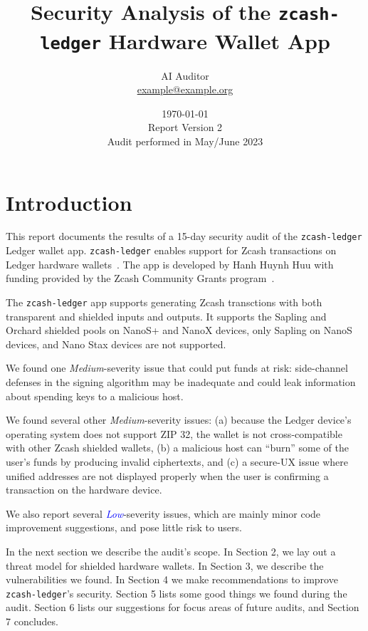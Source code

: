 \documentclass[10pt,titlepage]{article}
\title{Security Analysis of the \texttt{zcash-ledger} Hardware Wallet App}
\author{
    AI Auditor \\
        \href{mailto:example@example.org}{example@example.org}\\
}
\date{\today\\ Report Version 2\\ Audit performed in May/June 2023}
\newcommand{\MediumIssue}{\textcolor{darkyellow}{\emph{Medium}}}
\newcommand{\LowIssue}{\textcolor{blue}{\emph{Low}}}
\begin{document}
\maketitle
{\small\tableofcontents}

\pagebreak

\section{Introduction}

This report documents the results of a 15-day security audit of the
\texttt{zcash-ledger} Ledger wallet app. \texttt{zcash-ledger} enables support
for Zcash transactions on Ledger hardware wallets~\cite{zcashledger}.  The app
is developed by Hanh Huynh Huu with funding provided by the Zcash Community
Grants program~\cite{zcg}.

The \texttt{zcash-ledger} app supports generating Zcash transctions with both
transparent and shielded inputs and outputs. It supports the Sapling and Orchard
shielded pools on NanoS+ and NanoX devices, only Sapling on NanoS devices, and
Nano Stax devices are not supported.

We found one \MediumIssue-severity issue that could put funds at risk:
side-channel defenses in the signing algorithm may be inadequate and could leak
information about spending keys to a malicious host.

We found several other \MediumIssue-severity issues: (a) because the Ledger
device's operating system does not support ZIP 32, the wallet is not
cross-compatible with other Zcash shielded wallets, (b) a malicious host can
``burn'' some of the user's funds by producing invalid ciphertexts, and (c) a
secure-UX issue where unified addresses are not displayed properly when the user
is confirming a transaction on the hardware device.

We also report several \LowIssue-severity issues, which are mainly minor code
improvement suggestions, and pose little risk to users.

In the next section we describe the audit's scope. In Section 2, we lay out a
threat model for shielded hardware wallets. In Section 3, we describe the
vulnerabilities we found. In Section 4 we make recommendations to improve
\texttt{zcash-ledger}'s security. Section 5 lists some good things we found
during the audit.  Section 6 lists our suggestions for focus areas of future
audits, and Section 7 concludes.
\end{document}
